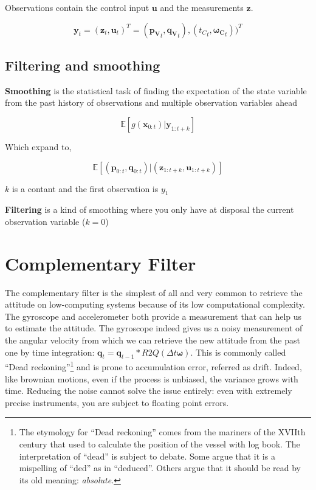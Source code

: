\documentclass[]{article}
\begin{document}
Observations contain the control input \(\mathbf{u}\) and the
measurements \(\mathbf{z}\).

\[\mathbf{y}_t = (\mathbf{z}_t, \mathbf{u}_t)^T = (\mathbf{p_V}_t, \mathbf{q_V}_t), ({t_C}_t, \mathbf{\boldsymbol{\omega}_C}_t))^T\]

\subsection{Filtering and smoothing}\label{filtering-and-smoothing}

\textbf{Smoothing} is the statistical task of finding the expectation of
the state variable from the past history of observations and multiple
observation variables ahead

\[\mathbb{E}[g(\mathbf{x}_{0:t}) | \mathbf{y}_{1:t+k}]\]

Which expand to,

\[\mathbb{E}[(\mathbf{p}_{0:t}, \mathbf{q}_{0:t}) | (\mathbf{z}_{1:t+k}, \mathbf{u}_{1:t+k})]\]

\(k\) is a contant and the first observation is \(y_1\)

\textbf{Filtering} is a kind of smoothing where you only have at
disposal the current observation variable (\(k=0\))

\section{Complementary Filter}\label{complementary-filter}

The complementary filter is the simplest of all and very common to
retrieve the attitude on low-computing systems because of its low
computational complexity. The gyroscope and accelerometer both provide a
measurement that can help us to estimate the attitude. The gyroscope
indeed gives us a noisy measurement of the angular velocity from which
we can retrieve the new attitude from the past one by time integration:
\(\mathbf{q}_t = \mathbf{q}_{t-1}*R2Q(\Delta t \mathbf{\omega})\). This
is commonly called ``Dead reckoning''\footnote{The etymology for ``Dead
  reckoning'' comes from the mariners of the XVIIth century that used to
  calculate the position of the vessel with log book. The interpretation
  of ``dead'' is subject to debate. Some argue that it is a mispelling
  of ``ded'' as in ``deduced''. Others argue that it should be read by
  its old meaning: \emph{absolute}.} and is prone to accumulation error,
referred as drift. Indeed, like brownian motions, even if the process is
unbiased, the variance grows with time. Reducing the noise cannot solve
the issue entirely: even with extremely precise instruments, you are
subject to floating point errors.
\end{document}

